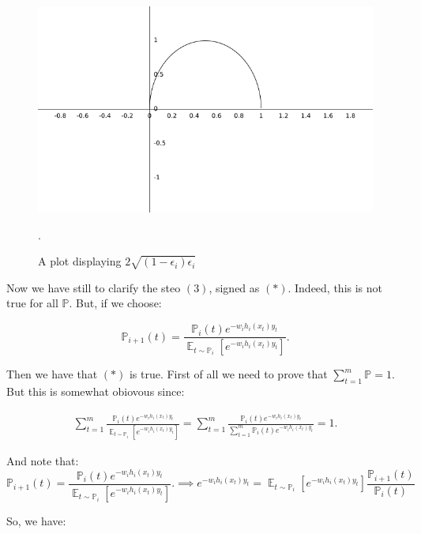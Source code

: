 \documentclass{article}
\DeclareMathOperator{\E}{\mathbb{E}}
\begin{document}
\begin{figure}
  \includegraphics[width=\linewidth]{../images/x(x-1).png}
  \caption{A plot displaying $2\sqrt{(1-\epsilon_i)\epsilon_i}$}.
  \label{fig:x(x-1)}
\end{figure}

Now we have still to clarify the steo $(3)$, signed as $(*)$. Indeed, this is not true for all $\mathbb{P}$.
But, if we choose:

$$
\mathbb{P}_{i+1}(t) = \frac{\mathbb{P}_{i}(t)e^{-w_i h_i(x_t) y_t}}{\E_{t\sim \mathbb{P}_i} [ e^{-w_i h_i(x_t) y_t} ]}.
$$

Then we have that $(*)$ is true. First of all we need to prove that $\sum_{t=1}^{m} \mathbb{P} = 1$.
But this is somewhat obiovous since:

\begin{align*}
\sum_{t=1}^{m} \frac{\mathbb{P}_{i}(t)e^{-w_i h_i(x_t) y_t}}{\E_{t\sim \mathbb{P}_i} [ e^{-w_i h_i(x_t) y_t} ]} = 
\sum_{t=1}^{m} \frac{\mathbb{P}_{i}(t)e^{-w_i h_i(x_t) y_t}}{\sum_{t=1}^{m} \mathbb{P}_i(t) e^{-w_i h_i(x_t) y_t} } = 
1.
\end{align*}

And note that:
$$
\mathbb{P}_{i+1}(t) = \frac{\mathbb{P}_{i}(t)e^{-w_i h_i(x_t) y_t}}{\E_{t\sim \mathbb{P}_i} [ e^{-w_i h_i(x_t) y_t} ]}.
\implies e^{-w_i h_i(x_t) y_t} = \E_{t\sim \mathbb{P}_i} [ e^{-w_i h_i(x_t) y_t} ] \frac{\mathbb{P}_{i+1}(t)}{\mathbb{P}_{i}(t)}
$$

So, we have:
\end{document}
